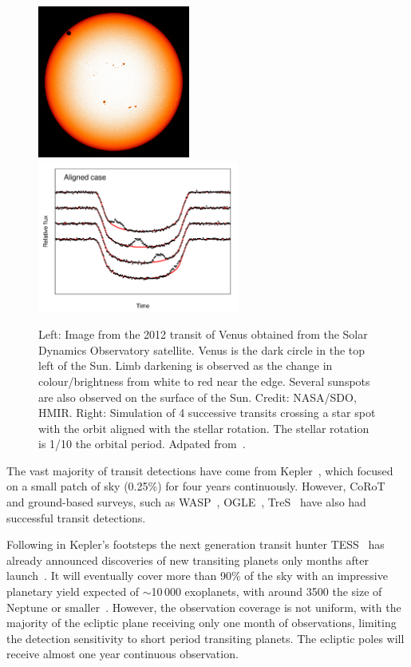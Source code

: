 \begin{figure}
    \centering
    \includegraphics[height=5cm]{./figures/introduction/SDO_2012_Venus_Transit.jpg}
    \includegraphics[height=5cm]{figures/introduction/sanchisojedafig1-crop.pdf}
    \caption{Left: Image from the 2012 transit of Venus obtained from the Solar Dynamics Observatory satellite. Venus is the dark circle in the top left of the Sun. Limb darkening is observed as the change in colour/brightness from white to red near the edge. Several sunspots are also observed on the surface of the Sun.
    Credit: NASA/SDO, HMIR. Right: Simulation of 4 successive transits crossing a star spot with the orbit aligned with the stellar rotation. The stellar rotation is 1/10 the orbital period. Adpated from~\citet[][Figure~1]{sanchis-ojeda_starspots_2013}.}
    \label{fig:transit_venus_transit_alignment}
\end{figure}


The vast majority of transit detections have come from Kepler~\citep{borucki_characteristics_2011}, which focused on a small patch of sky (0.25\%) for four years continuously.
However, {CoRoT}~\citep{barge_transiting_2008} and ground-based surveys, such as WASP~\citep{pollacco_wasp_2006}, OGLE~\citep{udalski_optical_2002}, TreS~\citep{alonso_tres1_2004} have also had successful transit detections.

Following in Kepler's footsteps the next generation transit hunter {TESS}~\citep{ricker_transiting_2015} has already announced discoveries of new transiting planets only months after launch~\citep{vanderspek_tess_2018, gandolfi_tess_2018, huang_tess_2018}.
It will eventually cover more than 90\% of the sky with an impressive planetary yield expected of $\sim$10\,000 exoplanets, with around 3500 the size of Neptune or smaller~\citep{barclay_revised_2018, huang_expected_2018}.
However, the observation coverage is not uniform, with the majority of the ecliptic plane receiving only one month of observations, limiting the detection sensitivity to short period transiting planets. The ecliptic poles will receive almost one year continuous observation.


